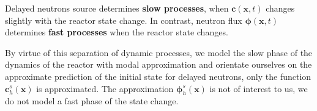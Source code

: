 \documentclass[landscape,a1paper,fontscale=0.5]{poster}
\begin{document}
\begin{poster}
{Delayed neutrons source determines \textbf{slow processes}, when  $\bm c(\bm x,t)$ changes slightly with the reactor state change. In contrast, neutron flux $\bm \phi(\bm x,t)$ determines \textbf{fast processes} when the reactor state changes. 

\vspace{1em}
By virtue of this separation of dynamic processes, we model the slow phase of the dynamics of the reactor with modal approximation and orientate ourselves on the approximate prediction of the initial state for delayed neutrons, only the function  $\bm c_h^s (\bm x)$ is approximated. The approximation  $\bm \phi_h^s (\bm x)$ is not of interest to us, we do not model a fast phase of the state change.
}

\end{poster}
\end{document}
